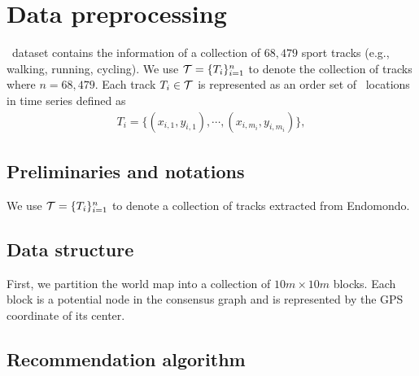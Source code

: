 
\section{Data preprocessing}

\edmd\ dataset contains the information of a collection of $68,479$ sport tracks (e.g., walking, running, cycling).
We use $\mathcal{T}=\{T_i\}_{i=1}^n$ to denote the collection of tracks where $n=68,479$.
Each track $T_i\in\mathcal{T}$ is represented as an order set of \gps\ locations in time series defined as
\begin{align*}
	T_i = \{(x_{i,1},y_{i,1}),\cdots,(x_{i,m_i},y_{i,m_i})\},
\end{align*}




\subsection{Preliminaries and notations}




We use $\mathcal{T}=\{T_i\}_{i=1}^{n}$ to denote a collection of tracks extracted from Endomondo.


\subsection{Data structure}

First, we partition the world map into a collection of $10m\times10m$ blocks.
Each block is a potential node in the consensus graph and is represented by the GPS coordinate of its center. 



\subsection{Recommendation algorithm}
